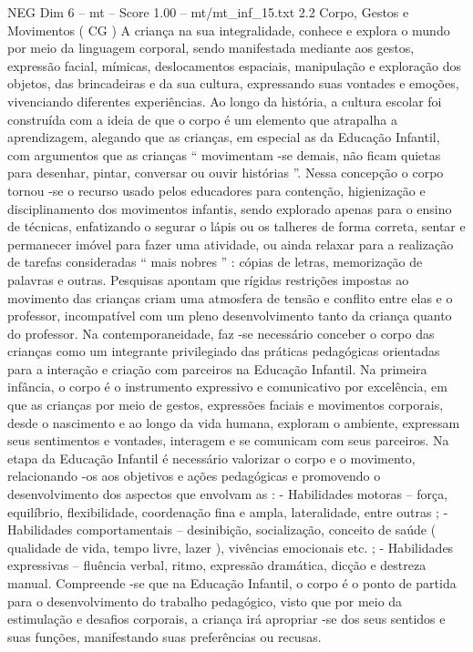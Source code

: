 \begin{textsample}{NEG Dim 6 – mt – Score 1.00 – mt/mt\_inf\_15.txt}  \label{ex:f6_neg_124}
2.2 Corpo, Gestos e Movimentos ( CG ) A criança na sua integralidade, conhece e explora o mundo por meio da linguagem corporal, sendo manifestada mediante aos gestos, expressão facial, mímicas, deslocamentos espaciais, manipulação e exploração dos objetos, das brincadeiras e da sua cultura, expressando suas vontades e emoções, vivenciando diferentes experiências.
Ao longo da história, a cultura escolar foi construída com a ideia de que o corpo é um elemento que atrapalha a aprendizagem, alegando que as crianças, em especial as da Educação Infantil, com argumentos que as crianças “ movimentam -se demais, não ficam quietas para desenhar, pintar, conversar ou ouvir histórias ”.
Nessa concepção o corpo tornou -se o recurso usado pelos educadores para contenção, higienização e disciplinamento dos movimentos infantis, sendo explorado apenas para o ensino de técnicas, enfatizando o segurar o lápis ou os talheres de forma correta, sentar e permanecer imóvel para fazer uma atividade, ou ainda relaxar para a realização de tarefas consideradas “ mais nobres ” : cópias de letras, memorização de palavras e outras.
Pesquisas apontam que rígidas restrições impostas ao movimento das crianças criam uma atmosfera de tensão e conflito entre elas e o professor, incompatível com um pleno desenvolvimento tanto da criança quanto do professor.
Na contemporaneidade, faz -se necessário conceber o corpo das crianças como um integrante privilegiado das práticas pedagógicas orientadas para a interação e criação com parceiros na Educação Infantil.
Na primeira infância, o corpo é o instrumento expressivo e comunicativo por excelência, em que as crianças por meio de gestos, expressões faciais e movimentos corporais, desde o nascimento e ao longo da vida humana, exploram o ambiente, expressam seus sentimentos e vontades, interagem e se comunicam com seus parceiros.
Na etapa da Educação Infantil é necessário valorizar o corpo e o movimento, relacionando -os aos objetivos e ações pedagógicas e promovendo o desenvolvimento dos aspectos que envolvam as : - Habilidades motoras – força, equilíbrio, flexibilidade, coordenação fina e ampla, lateralidade, entre outras ; - Habilidades comportamentais – desinibição, socialização, conceito de saúde ( qualidade de vida, tempo livre, lazer ), vivências emocionais etc. ; - Habilidades expressivas – fluência verbal, ritmo, expressão dramática, dicção e destreza manual.
Compreende -se que na Educação Infantil, o corpo é o ponto de partida para o desenvolvimento do trabalho pedagógico, visto que por meio da estimulação e desafios corporais, a criança irá apropriar -se dos seus sentidos e suas funções, manifestando suas preferências ou recusas.

\end{textsample}
